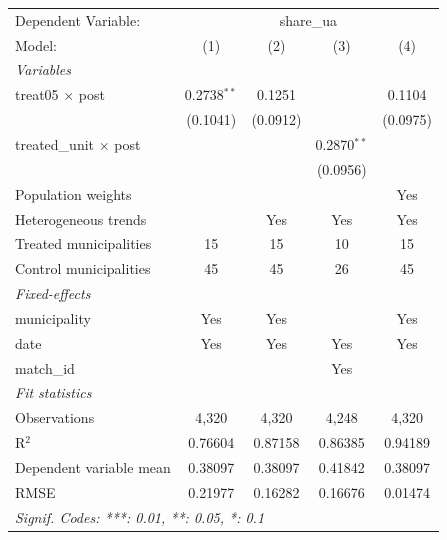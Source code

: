 
\begingroup
\centering
\begin{tabular}{lcccc}
   \tabularnewline \midrule \midrule
   Dependent Variable: & \multicolumn{4}{c}{share\_ua}\\
   Model:                        & (1)           & (2)      & (3)           & (4)\\  
   \midrule
   \emph{Variables}\\
   treat05 $\times$ post         & 0.2738$^{**}$ & 0.1251   &               & 0.1104\\   
                                 & (0.1041)      & (0.0912) &               & (0.0975)\\   
   treated\_unit $\times$ post   &               &          & 0.2870$^{**}$ &   \\   
                                 &               &          & (0.0956)      &   \\   
   Population weights            &               &          &               & Yes\\  
   Heterogeneous trends          &               & Yes      & Yes           & Yes\\  
   Treated municipalities        & 15            & 15       & 10            & 15\\  
   Control municipalities        & 45            & 45       & 26            & 45\\  
   \midrule
   \emph{Fixed-effects}\\
   municipality                  & Yes           & Yes      &               & Yes\\  
   date                          & Yes           & Yes      & Yes           & Yes\\  
   match\_id                     &               &          & Yes           & \\  
   \midrule
   \emph{Fit statistics}\\
   Observations                  & 4,320         & 4,320    & 4,248         & 4,320\\  
   R$^2$                         & 0.76604       & 0.87158  & 0.86385       & 0.94189\\  
   Dependent variable mean       & 0.38097       & 0.38097  & 0.41842       & 0.38097\\  
   RMSE                          & 0.21977       & 0.16282  & 0.16676       & 0.01474\\  
   \midrule \midrule
   \multicolumn{5}{l}{\emph{Signif. Codes: ***: 0.01, **: 0.05, *: 0.1}}\\
\end{tabular}
\par\endgroup


